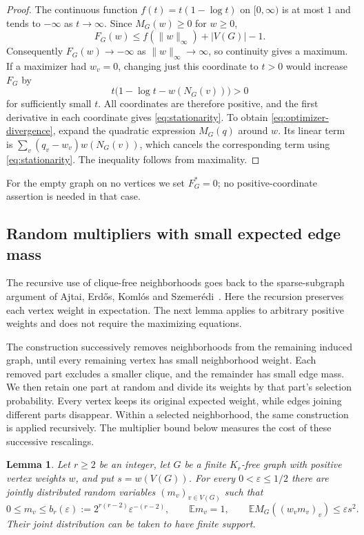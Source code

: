 \documentclass[11pt]{article}
\newtheorem{lemma}[theorem]{Lemma}
\theoremstyle{definition}
\theoremstyle{remark}
\numberwithin{equation}{section}
\begin{document}
\begin{proof}
The continuous function $f(t)=t(1-\log t)$ on $[0,\infty)$ is at most $1$
and tends to $-\infty$ as $t\to\infty$.  Since $M_G(w)\ge0$ for $w\ge0$,
\[
 F_G(w)\le f(\|w\|_\infty)+|V(G)|-1.
\]
Consequently $F_G(w)\to-\infty$ as $\|w\|_\infty\to\infty$, so continuity
gives a maximum.  If a maximizer had $w_v=0$, changing just this coordinate
to $t>0$ would increase $F_G$ by
\[
 t\bigl(1-\log t-w(N_G(v))\bigr)>0
\]
for sufficiently small $t$.  All coordinates are therefore positive, and
the first derivative in each coordinate gives \eqref{eq:stationarity}.
To obtain \eqref{eq:optimizer-divergence}, expand the quadratic expression
$M_G(q)$ around $w$.  Its linear term is
$\sum_v(q_v-w_v)w(N_G(v))$, which cancels the corresponding term using
\eqref{eq:stationarity}.  The inequality follows from maximality.
\end{proof}

For the empty graph on no vertices we set $F_G^*=0$; no positive-coordinate
assertion is needed in that case.

\subsection{Random multipliers with small expected edge mass}

The recursive use of clique-free neighborhoods goes back to the
sparse-subgraph argument of Ajtai, Erd\H{o}s, Koml\'os and
Szemer\'edi~\cite[Section~3]{AEKS1981}. Here the recursion preserves
each vertex weight in expectation. The next lemma applies to arbitrary
positive weights and does not require the maximizing equations.

The construction successively removes neighborhoods from the remaining
induced graph, until every remaining vertex has small neighborhood weight.
Each removed part excludes a smaller clique, and the remainder has small
edge mass. We then retain one part at random and divide its weights by
that part's selection probability.
Every vertex keeps its original expected weight, while edges joining
different parts disappear. Within a selected neighborhood, the same
construction is applied recursively. The multiplier bound below measures
the cost of these successive rescalings.

\begin{lemma}\label{lem:sparse-multipliers}
Let $r\ge2$ be an integer, let $G$ be a finite $K_r$-free graph with positive vertex
weights $w$, and put $s=w(V(G))$.  For every $0<\varepsilon\le1/2$ there
are jointly distributed random variables $(m_v)_{v\in V(G)}$ such that
\begin{equation}\label{eq:sparse-multipliers}
 0\le m_v\le b_r(\varepsilon)
 :=2^{r(r-2)}\varepsilon^{-(r-2)},\qquad
 \mathbb E m_v=1,\qquad
 \mathbb E M_G((w_vm_v)_v)\le\varepsilon s^2.
\end{equation}
Their joint distribution can be taken to have finite support.
\end{lemma}
\end{document}
